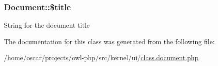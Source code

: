 \subsubsection[{\$title}]{\setlength{\rightskip}{0pt plus 5cm}Document::\$title}\label{classDocument_a7cd6b0f7a5c8926d8b89e23bee51e7f5}
String for the document title 

The documentation for this class was generated from the following file:\begin{DoxyCompactItemize}
\item 
/home/oscar/projects/owl-\/php/src/kernel/ui/\hyperlink{class_8document_8php}{class.document.php}\end{DoxyCompactItemize}
